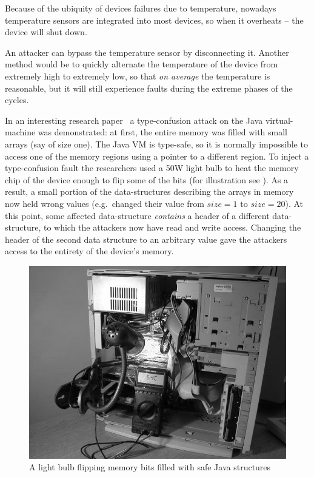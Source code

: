 Because of the ubiquity of devices failures due to temperature, nowadays
temperature sensors are integrated into most devices, so when it overheats --
the device will shut down.

An attacker can bypass the temperature sensor by disconnecting it. Another
method would be to quickly alternate the temperature of the device from
extremely high to extremely low, so that \emph{on average} the temperature is
reasonable, but it will still experience faults during the extreme phases of the
cycles.

In an interesting research paper~\cite{appel} a type-confusion attack on the
Java virtual-machine was demonstrated: at first, the entire memory was filled
with small arrays (say of size one). The Java VM is type-safe, so it is normally
impossible to access one of the memory regions using a pointer to a different
region. To inject a type-confusion fault the researchers used a 50W light bulb
to heat the memory chip of the device enough to flip some of the bits (for
illustration see ). As a result, a small portion of
the data-structures describing the arrays in memory now held wrong values (e.g.\
changed their value from \(size=1\) to \(size=20\)). At this point, some
affected data-structure \emph{contains} a header of a different data-structure,
to which the attackers now have read and write access. Changing the header of
the second data structure to an arbitrary value gave the attackers access to the
entirety of the device's memory.

\begin{figure}[!ht]
	\centering
	\includegraphics[width=0.7\linewidth]{images/chapter_9/bulb.png}
	\caption{A light bulb flipping memory bits filled with safe Java structures}\label{fig:memory_lightbulb}
\end{figure}

